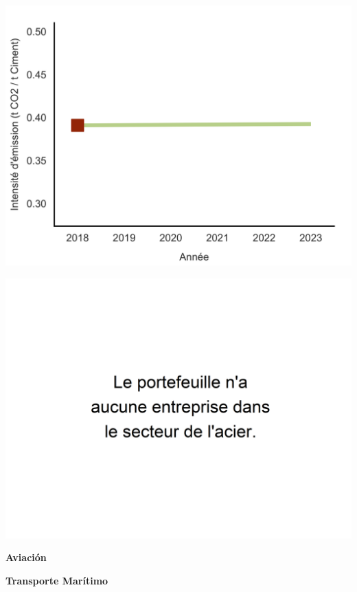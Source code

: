 \documentclass[10pt,table]{article}\usepackage[]{graphicx}\usepackage[]{color}
\begin{document}
	\begin{multicols}{2}
		
		\includegraphics[width=.9\linewidth]{ReportOutputs/Fig30} \vfill\null \columnbreak
		
		\includegraphics[width=.9\linewidth]{ReportOutputs/Fig31}
		
	\end{multicols}
	
	\begin{multicols}{2}
		
		\textbf{Aviación}
		
		\textbf{Transporte Marítimo}
		
	\end{multicols}
	
	\vspace{0cm}
	
\end{document}
